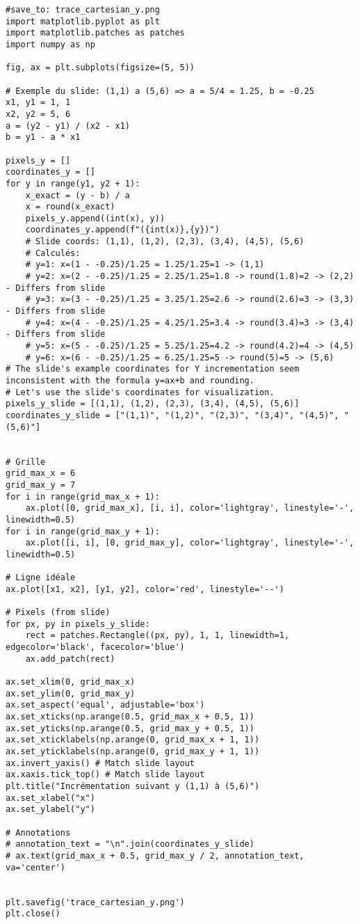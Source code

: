 \documentclass{article}
\begin{document}
\begin{verbatim}
#save_to: trace_cartesian_y.png
import matplotlib.pyplot as plt
import matplotlib.patches as patches
import numpy as np

fig, ax = plt.subplots(figsize=(5, 5))

# Exemple du slide: (1,1) a (5,6) => a = 5/4 = 1.25, b = -0.25
x1, y1 = 1, 1
x2, y2 = 5, 6
a = (y2 - y1) / (x2 - x1)
b = y1 - a * x1

pixels_y = []
coordinates_y = []
for y in range(y1, y2 + 1):
    x_exact = (y - b) / a
    x = round(x_exact)
    pixels_y.append((int(x), y))
    coordinates_y.append(f"({int(x)},{y})")
    # Slide coords: (1,1), (1,2), (2,3), (3,4), (4,5), (5,6)
    # Calculés:
    # y=1: x=(1 - -0.25)/1.25 = 1.25/1.25=1 -> (1,1)
    # y=2: x=(2 - -0.25)/1.25 = 2.25/1.25=1.8 -> round(1.8)=2 -> (2,2) - Differs from slide
    # y=3: x=(3 - -0.25)/1.25 = 3.25/1.25=2.6 -> round(2.6)=3 -> (3,3) - Differs from slide
    # y=4: x=(4 - -0.25)/1.25 = 4.25/1.25=3.4 -> round(3.4)=3 -> (3,4) - Differs from slide
    # y=5: x=(5 - -0.25)/1.25 = 5.25/1.25=4.2 -> round(4.2)=4 -> (4,5)
    # y=6: x=(6 - -0.25)/1.25 = 6.25/1.25=5 -> round(5)=5 -> (5,6)
# The slide's example coordinates for Y incrementation seem inconsistent with the formula y=ax+b and rounding.
# Let's use the slide's coordinates for visualization.
pixels_y_slide = [(1,1), (1,2), (2,3), (3,4), (4,5), (5,6)]
coordinates_y_slide = ["(1,1)", "(1,2)", "(2,3)", "(3,4)", "(4,5)", "(5,6)"]


# Grille
grid_max_x = 6
grid_max_y = 7
for i in range(grid_max_x + 1):
    ax.plot([0, grid_max_x], [i, i], color='lightgray', linestyle='-', linewidth=0.5)
for i in range(grid_max_y + 1):
    ax.plot([i, i], [0, grid_max_y], color='lightgray', linestyle='-', linewidth=0.5)

# Ligne idéale
ax.plot([x1, x2], [y1, y2], color='red', linestyle='--')

# Pixels (from slide)
for px, py in pixels_y_slide:
    rect = patches.Rectangle((px, py), 1, 1, linewidth=1, edgecolor='black', facecolor='blue')
    ax.add_patch(rect)

ax.set_xlim(0, grid_max_x)
ax.set_ylim(0, grid_max_y)
ax.set_aspect('equal', adjustable='box')
ax.set_xticks(np.arange(0.5, grid_max_x + 0.5, 1))
ax.set_yticks(np.arange(0.5, grid_max_y + 0.5, 1))
ax.set_xticklabels(np.arange(0, grid_max_x + 1, 1))
ax.set_yticklabels(np.arange(0, grid_max_y + 1, 1))
ax.invert_yaxis() # Match slide layout
ax.xaxis.tick_top() # Match slide layout
plt.title("Incrémentation suivant y (1,1) à (5,6)")
ax.set_xlabel("x")
ax.set_ylabel("y")

# Annotations
# annotation_text = "\n".join(coordinates_y_slide)
# ax.text(grid_max_x + 0.5, grid_max_y / 2, annotation_text, va='center')


plt.savefig('trace_cartesian_y.png')
plt.close()
\end{verbatim}
\end{document}
